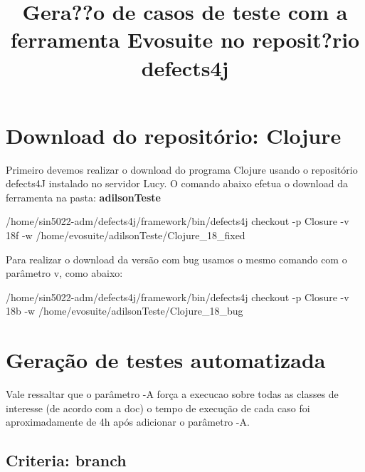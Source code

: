 \documentclass[11pt]{article}
\title{Gera??o de casos de teste com a ferramenta Evosuite no reposit?rio defects4j}
\newenvironment{Shaded}{}{}
\newcommand{\NormalTok}[1]{{#1}}
\newcommand{\ExtensionTok}[1]{{#1}}
\begin{document}
    
    
    \maketitle
    
    

    
    \hypertarget{download-do-reposituxf3rio-clojure}{%
\section{Download do repositório:
Clojure}\label{download-do-reposituxf3rio-clojure}}

    Primeiro devemos realizar o download do programa Clojure usando o
repositório defects4J instalado no servidor Lucy. O comando abaixo
efetua o download da ferramenta na pasta: \textbf{adilsonTeste}

    \begin{Shaded}
\begin{Highlighting}[]
\ExtensionTok{/home/sin5022-adm/defects4j/framework/bin/defects4j}\NormalTok{ checkout -p Closure -v 18f -w /home/evosuite/adilsonTeste/Clojure_18_fixed}
\end{Highlighting}
\end{Shaded}

    Para realizar o download da versão com bug usamos o mesmo comando com o
parâmetro v, como abaixo:

    \begin{Shaded}
\begin{Highlighting}[]
\ExtensionTok{/home/sin5022-adm/defects4j/framework/bin/defects4j}\NormalTok{ checkout -p Closure -v 18b -w /home/evosuite/adilsonTeste/Clojure_18_bug}
\end{Highlighting}
\end{Shaded}

    \hypertarget{gerauxe7uxe3o-de-testes-automatizada}{%
\section{Geração de testes
automatizada}\label{gerauxe7uxe3o-de-testes-automatizada}}

    Vale ressaltar que o parâmetro -A força a execucao sobre todas as
classes de interesse (de acordo com a doc) o tempo de execução de cada
caso foi aproximadamente de 4h após adicionar o parâmetro -A.

    \hypertarget{criteria-branch}{%
\subsection{Criteria: branch}\label{criteria-branch}}
\end{document}
